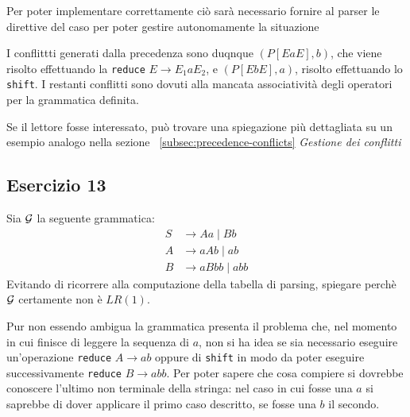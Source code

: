 \documentclass[class=book, crop=false, oneside, 12pt]{standalone}
\begin{document}
Per poter implementare correttamente ciò sarà necessario fornire al parser le direttive del caso per poter gestire autonomamente la situazione

I conflittti generati dalla precedenza sono duqnque \((P[EaE],b)\), che viene risolto effettuando la \texttt{reduce} \(E \to E_1 a E_2\), e \((P[EbE],a)\), risolto effettuando lo \texttt{shift}. I restanti conflitti sono dovuti alla mancata associatività degli operatori per la grammatica definita. 

Se il lettore fosse interessato, può trovare una spiegazione più dettagliata su un esempio analogo nella sezione ~\ref{subsec:precedence-conflicts} \emph{Gestione dei conflitti}

\subsection{Esercizio 13}


Sia \(\mathcal{G}\) la seguente grammatica:
\begin{align*}
    S &\to Aa \mid Bb \\
    A &\to aAb \mid ab \\
    B &\to aBbb \mid abb
\end{align*}
Evitando  di  ricorrere  alla  computazione  della  tabella  di  parsing,  spiegare  perchè \(\mathcal{G}\) certamente  non è \(LR(1)\).

Pur non essendo ambigua la grammatica presenta il problema che, nel momento in cui finisce di leggere la sequenza di \(a\), non si ha idea se sia necessario eseguire un'operazione \texttt{reduce} \(A \to ab\) oppure di \texttt{shift} in modo da poter eseguire successivamente \texttt{reduce} \(B \to abb\). Per poter sapere che cosa compiere si dovrebbe conoscere l'ultimo non terminale della stringa: nel caso in cui fosse una \(a\) si saprebbe di dover applicare il primo caso descritto, se fosse una \(b\) il secondo.
\end{document}
